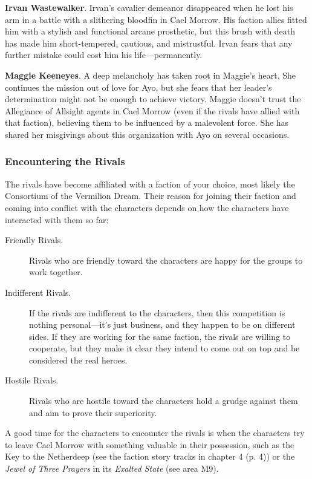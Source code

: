 \documentclass[a4paper, 11pt, bg=full, twocolumn, nooutline]{dndbook}
\begin{document}
\textbf{Irvan Wastewalker}. Irvan's cavalier demeanor disappeared when he lost his arm in a battle with a slithering bloodfin in Cael Morrow. His faction allies fitted him with a stylish and functional arcane prosthetic, but this brush with death has made him short-tempered, cautious, and mistrustful. Irvan fears that any further mistake could cost him his life---permanently.

\textbf{Maggie Keeneyes}. A deep melancholy has taken root in Maggie's heart. She continues the mission out of love for Ayo, but she fears that her leader's determination might not be enough to achieve victory. Maggie doesn't trust the Allegiance of Allsight agents in Cael Morrow (even if the rivals have allied with that faction), believing them to be influenced by a malevolent force. She has shared her misgivings about this organization with Ayo on several occasions.

\subsubsection{Encountering the Rivals}

The rivals have become affiliated with a faction of your choice, most likely the Consortium of the Vermilion Dream. Their reason for joining their faction and coming into conflict with the characters depends on how the characters have interacted with them so far:

\begin{description}
\item[Friendly Rivals.] Rivals who are friendly toward the characters are happy for the groups to work together.
\item[Indifferent Rivals.] If the rivals are indifferent to the characters, then this competition is nothing personal---it's just business, and they happen to be on different sides. If they are working for the same faction, the rivals are willing to cooperate, but they make it clear they intend to come out on top and be considered the real heroes.
\item[Hostile Rivals.] Rivals who are hostile toward the characters hold a grudge against them and aim to prove their superiority.
\end{description}

A good time for the characters to encounter the rivals is when the characters try to leave Cael Morrow with something valuable in their possession, such as the Key to the Netherdeep (see the faction story tracks in chapter 4 (p. 4)) or the \textit{Jewel of Three Prayers} in its \textit{Exalted State} (see area M9).
\end{document}
